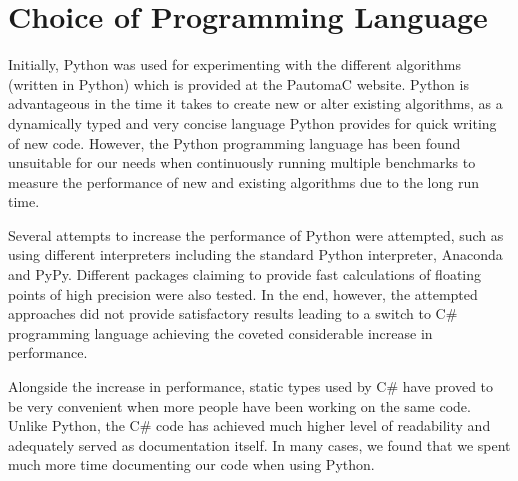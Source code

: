 \section{Choice of Programming Language}
Initially, Python was used for experimenting with the different algorithms (written in Python) which is provided at the PautomaC website. Python is advantageous in the time it takes to create new or alter existing algorithms, as a dynamically typed and very concise language Python provides for quick writing of new code. However, the Python programming language has been found unsuitable for our needs when continuously running multiple benchmarks to measure the performance of new and existing algorithms due to the long run time.

Several attempts to increase the performance of Python were attempted, such as using different interpreters including the standard Python interpreter, Anaconda and PyPy. Different packages claiming to provide fast calculations of floating points of high precision were also tested. In the end, however, the attempted approaches did not provide satisfactory results leading to a switch to C\# programming language achieving the coveted considerable increase in performance.

Alongside the increase in performance, static types used by  C\# have proved to be very convenient when more people have been working on the same code. Unlike Python, the C\# code has achieved much higher level of readability and adequately served as documentation itself. In many cases, we found that we spent much more time documenting our code when using Python.
